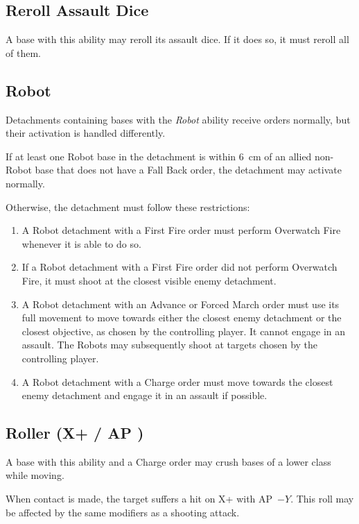 \subsection{Reroll Assault Dice}

A base with this ability may reroll its assault dice. If it does so, it must reroll all of them.

\subsection{Robot}

Detachments containing bases with the \textit{Robot} ability receive orders normally, but their activation is handled differently.

If at least one Robot base in the detachment is within 6~cm of an allied non-Robot base that does not have a Fall Back order, the detachment may activate normally.

Otherwise, the detachment must follow these restrictions:

\begin{enumerate}
    \item A Robot detachment with a First Fire order must perform Overwatch Fire whenever it is able to do so.

    \item If a Robot detachment with a First Fire order did not perform Overwatch Fire, it must shoot at the closest visible enemy detachment.

    \item A Robot detachment with an Advance or Forced March order must use its full movement to move towards either the closest enemy detachment or the closest objective, as chosen by the controlling player. It cannot engage in an assault. The Robots may subsequently shoot at targets chosen by the controlling player.

    \item A Robot detachment with a Charge order must move towards the closest enemy detachment and engage it in an assault if possible.
\end{enumerate}

\subsection{Roller (X+ / AP )}

A base with this ability and a Charge order may crush bases of a lower class while moving.

When contact is made, the target suffers a hit on X+ with AP~$-Y$. This roll may be affected by the same modifiers as a shooting attack.

